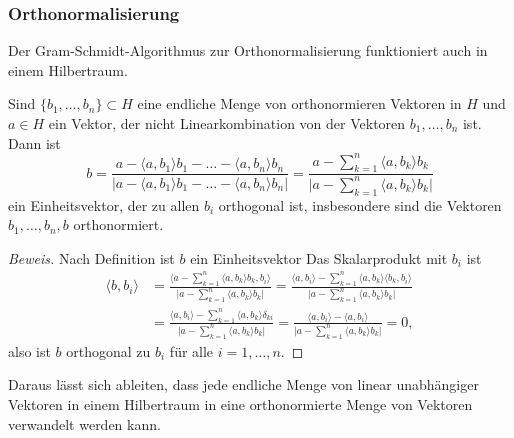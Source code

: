 \subsubsection{Orthonormalisierung}
Der Gram-Schmidt-Algorithmus zur Orthonormalisierung funktioniert auch
in einem Hilbertraum.

\begin{satz}
\label{satz:orthonormierung}
Sind $\{b_1,\dots,b_n\}\subset H$ eine endliche Menge von orthonormieren
Vektoren in $H$ und $a\in H$ ein Vektor, der nicht Linearkombination
von der Vektoren $b_1,\dots,b_n$ ist.
Dann ist
\[
b
=
\frac{a-\langle a,b_1\rangle b_1-\dots-\langle a,b_n\rangle b_n}%
{|a-\langle a,b_1\rangle b_1-\dots-\langle a,b_n\rangle b_n|}
=
\frac{a-\displaystyle\sum_{k=1}^n \langle a,b_k\rangle b_k}%
{\biggl| a-\displaystyle\sum_{k=1}^n \langle a,b_k\rangle b_k\biggr|}
\]
ein Einheitsvektor, der zu allen $b_i$ orthogonal ist, insbesondere sind
die Vektoren
$b_1,\dots,b_n,b$ orthonormiert.
\end{satz}

\begin{proof}[Beweis]
Nach Definition ist $b$ ein Einheitsvektor
Das Skalarprodukt mit $b_i$ ist
\begin{align*}
\langle b, b_i\rangle
&=
\frac{\biggl\langle a-\displaystyle\sum_{k=1}^n \langle a,b_k\rangle b_k,b_i\biggr\rangle}%
{\biggl| a-\displaystyle\sum_{k=1}^n \langle a,b_k\rangle b_k\biggr|}
=
\frac{\langle a,b_i\rangle-\displaystyle\sum_{k=1}^n \langle a,b_k\rangle \langle b_k,b_i\rangle}%
{\biggl| a-\displaystyle\sum_{k=1}^n \langle a,b_k\rangle b_k\biggr|}
\\
&=
\frac{\langle a,b_i\rangle-\displaystyle\sum_{k=1}^n \langle a,b_k\rangle \delta_{ki}}%
{\biggl| a-\displaystyle\sum_{k=1}^n \langle a,b_k\rangle b_k\biggr|}
=
\frac{\langle a,b_i\rangle-\langle a,b_i\rangle}%
{\biggl| a-\displaystyle\sum_{k=1}^n \langle a,b_k\rangle b_k\biggr|}
=0,
\end{align*}
also ist $b$ orthogonal zu $b_i$ für alle $i=1,\dots,n$.
\end{proof}

Daraus lässt sich ableiten, dass jede endliche Menge von linear unabhängiger
Vektoren in einem Hilbertraum in eine orthonormierte Menge von Vektoren
verwandelt werden kann.

